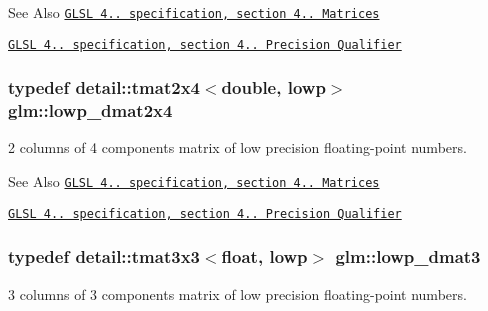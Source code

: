 \begin{DoxySeeAlso}{See Also}
\href{http://www.opengl.org/registry/doc/GLSLangSpec.4.20.8.pdf}{\tt G\-L\-S\-L 4.. specification, section 4.. Matrices} 

\href{http://www.opengl.org/registry/doc/GLSLangSpec.4.20.8.pdf}{\tt G\-L\-S\-L 4.. specification, section 4.. Precision Qualifier} 
\end{DoxySeeAlso}
\hypertarget{group__core__precision_gac2285cef559b0dc35cb9a7f22e6a2dd8}{
\subsubsection[{lowp\-\_\-dmat2x4}]{\setlength{\rightskip}{0pt plus 5cm}typedef detail\-::tmat2x4$<$double, lowp$>$ {\bf glm\-::lowp\-\_\-dmat2x4}}}\label{group__core__precision_gac2285cef559b0dc35cb9a7f22e6a2dd8}
2 columns of 4 components matrix of low precision floating-\/point numbers.

\begin{DoxySeeAlso}{See Also}
\href{http://www.opengl.org/registry/doc/GLSLangSpec.4.20.8.pdf}{\tt G\-L\-S\-L 4.. specification, section 4.. Matrices} 

\href{http://www.opengl.org/registry/doc/GLSLangSpec.4.20.8.pdf}{\tt G\-L\-S\-L 4.. specification, section 4.. Precision Qualifier} 
\end{DoxySeeAlso}
\hypertarget{group__core__precision_ga07d9423bdde2d7ff880d6ece01dc9e32}{
\subsubsection[{lowp\-\_\-dmat3}]{\setlength{\rightskip}{0pt plus 5cm}typedef detail\-::tmat3x3$<$float, lowp$>$ {\bf glm\-::lowp\-\_\-dmat3}}}\label{group__core__precision_ga07d9423bdde2d7ff880d6ece01dc9e32}
3 columns of 3 components matrix of low precision floating-\/point numbers.

